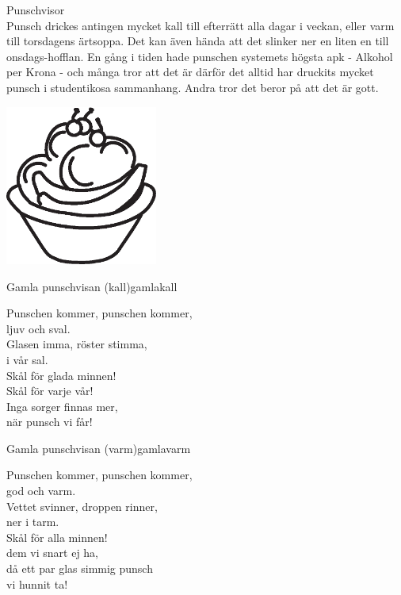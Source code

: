 \begin{flushleft}
{\Huge Punschvisor\\}
\vspace{1cm}
\Large{
Punsch drickes antingen mycket kall till efterrätt alla dagar i veckan,
eller varm till torsdagens ärtsoppa. Det kan även hända att det
slinker ner en liten en till onsdags-hofflan. En gång i tiden hade
punschen systemets högsta apk - Alkohol per Krona - och många tror att
det är därför det alltid har druckits mycket punsch i studentikosa
sammanhang. Andra tror det beror på att det är gott.}
\end{flushleft}
\vspace{2cm}
\begin{center}
\includegraphics[width=5cm]{bilder/47.eps}
\end{center}
\newpage

\begin{song}{Gamla punschvisan (kall)}{gamlakall}
\begin{vers}
Punschen kommer, punschen kommer,\\
ljuv och sval.\\
Glasen imma, röster stimma,\\
i vår sal.\\
Skål för glada minnen!\\
Skål för varje vår!\\
Inga sorger finnas mer,\\
när punsch vi får!\\
\end{vers}
\end{song}

\begin{song}{Gamla punschvisan (varm)}{gamlavarm}
\begin{vers}
Punschen kommer, punschen kommer,\\
god och varm.\\
Vettet svinner, droppen rinner,\\
ner i tarm.\\
Skål för alla minnen!\\
dem vi snart ej ha,\\
då ett par glas simmig punsch \\
vi hunnit ta!\\
\end{vers}
\end{song}

